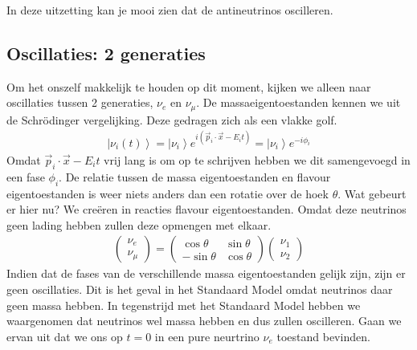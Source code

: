 \documentclass[../main.tex]{subfiles}
\begin{document}
In deze uitzetting kan je mooi zien dat de antineutrinos oscilleren.

\subsection{Oscillaties: 2 generaties}%
\label{sub:oscillaties_2_generaties}

Om het onszelf makkelijk te houden op dit moment, kijken we alleen naar oscillaties tussen 2 generaties, $\nu_e$ en $\nu_\mu$. De massaeigentoestanden kennen we uit de Schrödinger vergelijking. Deze gedragen zich als een vlakke golf.
\begin{equation}
    \begin{aligned}
        \label{eq:massa_eigentoestanden_neutrinos}
        \left|\nu_{i}(t)\right>=\left| \nu_{i}\right>e^{i\left(\vec{p}_{i} \cdot \vec{x}-E_{i} t\right)}=\left| \nu_{i}\right>e^{-i \phi_{i}}
    \end{aligned}
\end{equation}
Omdat $\vec{p}_{i} \cdot \vec{x}-E_{i} t$ vrij lang is om op te schrijven hebben we dit samengevoegd in een fase $\phi_i$. De relatie tussen de massa eigentoestanden en flavour eigentoestanden is weer niets anders dan een rotatie over de hoek $\theta$. Wat gebeurt er hier nu? We creëren in reacties flavour eigentoestanden. Omdat deze neutrinos geen lading hebben zullen deze opmengen met elkaar.
\begin{equation}
    \begin{aligned}
        \label{eq:neutrino_2_gen_opmenging}
        \left(\begin{array}{c}
                \nu_{e} \\
                \nu_{\mu}
                \end{array}\right)=\left(\begin{array}{cc}
                \cos \theta & \sin \theta \\
                -\sin \theta & \cos \theta
                \end{array}\right)\left(\begin{array}{l}
                \nu_{1} \\
                \nu_{2}
        \end{array}\right)
    \end{aligned}
\end{equation}
Indien dat de fases van de verschillende massa eigentoestanden gelijk zijn, zijn er geen oscillaties. Dit is het geval in het Standaard Model omdat neutrinos daar geen massa hebben. In tegenstrijd met het Standaard Model hebben we waargenomen dat neutrinos wel massa hebben en dus zullen oscilleren. Gaan we ervan uit dat we ons op $t=0$ in een pure neurtrino $\nu_e$ toestand bevinden.
\end{document}
